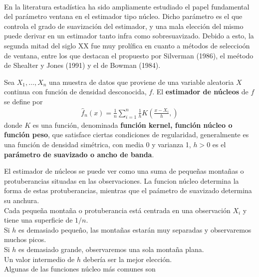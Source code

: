 \\
\newline
\noindent En la literatura estadística ha sido ampliamente estudiado el papel fundamental del parámetro ventana en el estimador tipo núcleo. Dicho parámetro es el que controla el grado de suavización del estimador, y una mala elección del mismo puede derivar en un estimador tanto infra como sobresuavizado. Debido a esto, la segunda mitad del siglo XX fue muy prolífica en cuanto a métodos de seleccioón de ventana, entre los que destacan el propuesto por Silverman (1986), el meétodo de Shealter y Jones (1991) y el de Bowman (1984).

\begin{defi}
    Sea $X_1,\ldots, X_n$ una muestra de datos que proviene de una variable aleatoria $X$ continua con función de densidad desconocida, $f$. El \textbf{estimador de núcleos} de $f$ se define por
    \begin{align*}
        \hat{f}_n(x) = \frac{1}{n} \sum_{i=1}^{n} \frac{1}{h} K\left( \frac{x - X_i}{h}, \right) 
    \end{align*}
    donde $K$ es una función, denominada \textbf{función kernel, función núcleo o función peso}, que satisface ciertas condiciones de regularidad, generalmente es una función de densidad simétrica, con media 0 y varianza 1, $h > 0$ es el \textbf{parámetro de suavizado o ancho de banda}.
\end{defi}
El estimador de núcleos se puede ver como una suma de pequeñas montañas o protuberancias
situadas en las observaciones. La funcion núcleo determina la forma de estas protuberancias,
mientras que el paámetro de suavizado determina su anchura.
\\
\newline
\noindent Cada pequeña montaña o protuberancia está centrada en una observación $X_i$ y tiene una superficie de $1/n$.
\\
\newline
\noindent Si $h$ es demasiado pequeño, las montañas estarán muy separadas y observaremos muchos picos.
\\
\newline
\noindent Si $h$ es demasiado grande, observaremos una sola montaña plana.
\\
\newline
\noindent Un valor intermedio de $h$ debería ser la mejor elección.
\\
\newline
\noindent Algunas de las funciones núcleo más comunes son
